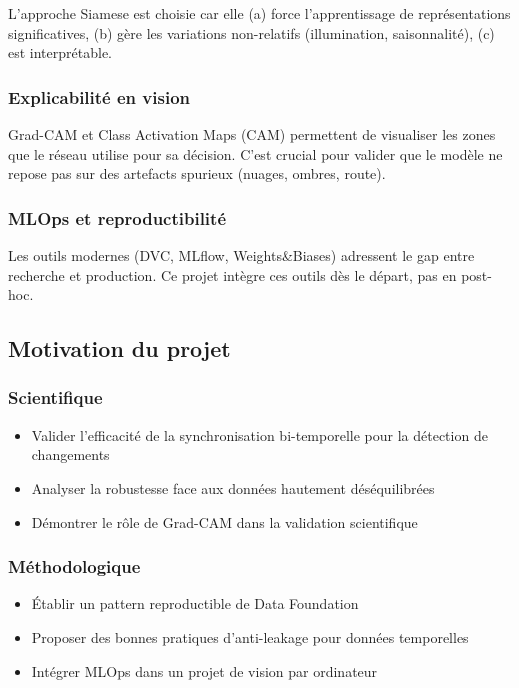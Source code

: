 L'approche Siamese est choisie car elle\: (a) force l'apprentissage de représentations significatives, 
(b) gère les variations non-relatifs (illumination, saisonnalité), (c) est interprétable.

\subsubsection{Explicabilité en vision}
Grad-CAM \cite{selvaraju2016grad} et Class Activation Maps (CAM) permettent de visualiser 
les zones que le réseau utilise pour sa décision. C'est crucial pour valider que le modèle 
ne repose pas sur des artefacts spurieux (nuages, ombres, route).

\subsubsection{MLOps et reproductibilité}
Les outils modernes (DVC, MLflow, Weights\&Biases) adressent le gap entre recherche et production. 
Ce projet intègre ces outils dès le départ, pas en post-hoc.

\subsection{Motivation du projet}

\subsubsection{Scientifique}
\begin{itemize}
    \item Valider l'efficacité de la synchronisation bi-temporelle pour la détection de changements
    \item Analyser la robustesse face aux données hautement déséquilibrées
    \item Démontrer le rôle de Grad-CAM dans la validation scientifique
\end{itemize}

\subsubsection{Méthodologique}
\begin{itemize}
    \item Établir un pattern reproductible de Data Foundation
    \item Proposer des bonnes pratiques d'anti-leakage pour données temporelles
    \item Intégrer MLOps dans un projet de vision par ordinateur
\end{itemize}

